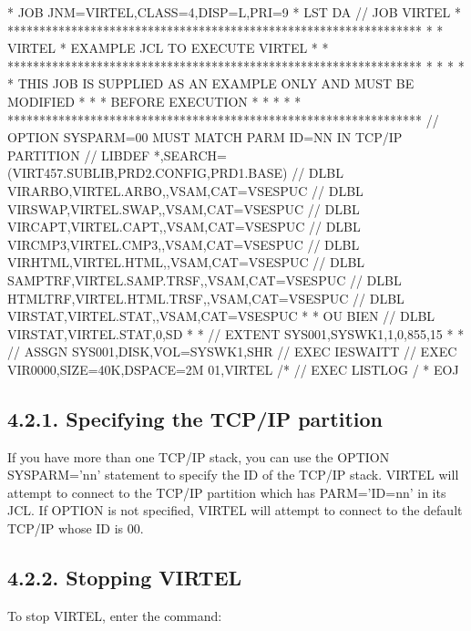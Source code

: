 \documentclass[letterpaper,10pt,english]{sphinxmanual}
\begin{document}
\begin{sphinxVerbatim}[commandchars=\\\{\}]
* \PYGZdl{}\PYGZdl{} JOB JNM=VIRTEL,CLASS=4,DISP=L,PRI=9
* \PYGZdl{}\PYGZdl{} LST DA
// JOB VIRTEL
* *****************************************************************
* * VIRTEL * EXAMPLE JCL TO EXECUTE VIRTEL *
* *****************************************************************
* * *
* * THIS JOB IS SUPPLIED AS AN EXAMPLE ONLY AND MUST BE MODIFIED *
* * BEFORE EXECUTION *
* * *
* *****************************************************************
// OPTION SYSPARM=\PYGZsq{}00\PYGZsq{} MUST MATCH PARM ID=NN IN TCP/IP PARTITION
// LIBDEF *,SEARCH=(VIRT457.SUBLIB,PRD2.CONFIG,PRD1.BASE)
// DLBL VIRARBO,\PYGZsq{}VIRTEL.ARBO\PYGZsq{},,VSAM,CAT=VSESPUC
// DLBL VIRSWAP,\PYGZsq{}VIRTEL.SWAP\PYGZsq{},,VSAM,CAT=VSESPUC
// DLBL VIRCAPT,\PYGZsq{}VIRTEL.CAPT\PYGZsq{},,VSAM,CAT=VSESPUC
// DLBL VIRCMP3,\PYGZsq{}VIRTEL.CMP3\PYGZsq{},,VSAM,CAT=VSESPUC
// DLBL VIRHTML,\PYGZsq{}VIRTEL.HTML\PYGZsq{},,VSAM,CAT=VSESPUC
// DLBL SAMPTRF,\PYGZsq{}VIRTEL.SAMP.TRSF\PYGZsq{},,VSAM,CAT=VSESPUC
// DLBL HTMLTRF,\PYGZsq{}VIRTEL.HTML.TRSF\PYGZsq{},,VSAM,CAT=VSESPUC
// DLBL VIRSTAT,\PYGZsq{}VIRTEL.STAT\PYGZsq{},,VSAM,CAT=VSESPUC
* * OU BIEN // DLBL VIRSTAT,\PYGZsq{}VIRTEL.STAT\PYGZsq{},0,SD
* * // EXTENT SYS001,SYSWK1,1,0,855,15
* * // ASSGN SYS001,DISK,VOL=SYSWK1,SHR
// EXEC IESWAITT
// EXEC VIR0000,SIZE=40K,DSPACE=2M
01,VIRTEL
/*
// EXEC LISTLOG
/\PYGZam{}
* \PYGZdl{}\PYGZdl{} EOJ
\end{sphinxVerbatim}



\subsection{4.2.1. Specifying the TCP/IP partition}
\label{\detokenize{Installation_Guide:specifying-the-tcp-ip-partition}}
If you have more than one TCP/IP stack, you can use the OPTION SYSPARM=’nn’ statement to specify the ID of the TCP/IP stack. VIRTEL will attempt to connect to the TCP/IP partition which has PARM=’ID=nn’ in its JCL. If OPTION is not specified, VIRTEL will attempt to connect to the default TCP/IP whose ID is 00.


\subsection{4.2.2. Stopping VIRTEL}
\label{\detokenize{Installation_Guide:id3}}
To stop VIRTEL, enter the command:
\end{document}
